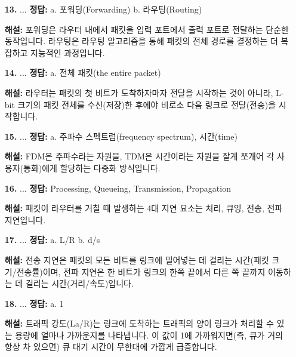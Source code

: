 \documentclass[a4paper, 10pt]{article}
\newcommand{\sectionbox}[1]{
  \vspace{0.5em}
  \noindent\fbox{\textbf{#1}}
  \vspace{0.5em}
}
\begin{document}
\begin{enumerate}[itemsep=2.5em, leftmargin=2em, label={}]
\item[\textbf{13.}] ...
\vspace{0.5em}
\noindent\textbf{정답:} a. 포워딩(Forwarding) b. 라우팅(Routing) \par
\small\textbf{해설:} 포워딩은 라우터 내에서 패킷을 입력 포트에서 출력 포트로 전달하는 단순한 동작입니다. 라우팅은 라우팅 알고리즘을 통해 패킷의 전체 경로를 결정하는 더 복잡하고 지능적인 과정입니다.

\item[\textbf{14.}] ...
\vspace{0.5em}
\noindent\textbf{정답:} a. 전체 패킷(the entire packet) \par
\small\textbf{해설:} 라우터는 패킷의 첫 비트가 도착하자마자 전달을 시작하는 것이 아니라, L-bit 크기의 패킷 전체를 수신(저장)한 후에야 비로소 다음 링크로 전달(전송)을 시작합니다.

\item[\textbf{15.}] ...
\vspace{0.5em}
\noindent\textbf{정답:} a. 주파수 스펙트럼(frequency spectrum), 시간(time) \par
\small\textbf{해설:} FDM은 주파수라는 자원을, TDM은 시간이라는 자원을 잘게 쪼개어 각 사용자(통화)에게 할당하는 다중화 방식입니다.

\item[] \sectionbox{IV. 성능: 지연, 손실, 처리량 (5문제)}

\item[\textbf{16.}] ...
\vspace{0.5em}
\noindent\textbf{정답:} Processing, Queueing, Transmission, Propagation \par
\small\textbf{해설:} 패킷이 라우터를 거칠 때 발생하는 4대 지연 요소는 처리, 큐잉, 전송, 전파 지연입니다.

\item[\textbf{17.}] ...
\vspace{0.5em}
\noindent\textbf{정답:} a. L/R  b. d/s \par
\small\textbf{해설:} 전송 지연은 패킷의 모든 비트를 링크에 밀어넣는 데 걸리는 시간(패킷 크기/전송률)이며, 전파 지연은 한 비트가 링크의 한쪽 끝에서 다른 쪽 끝까지 이동하는 데 걸리는 시간(거리/속도)입니다.

\item[\textbf{18.}] ...
\vspace{0.5em}
\noindent\textbf{정답:} a. 1 \par
\small\textbf{해설:} 트래픽 강도(La/R)는 링크에 도착하는 트래픽의 양이 링크가 처리할 수 있는 용량에 얼마나 가까운지를 나타냅니다. 이 값이 1에 가까워지면(즉, 큐가 거의 항상 차 있으면) 큐 대기 시간이 무한대에 가깝게 급증합니다.


\end{enumerate}
\end{document}
